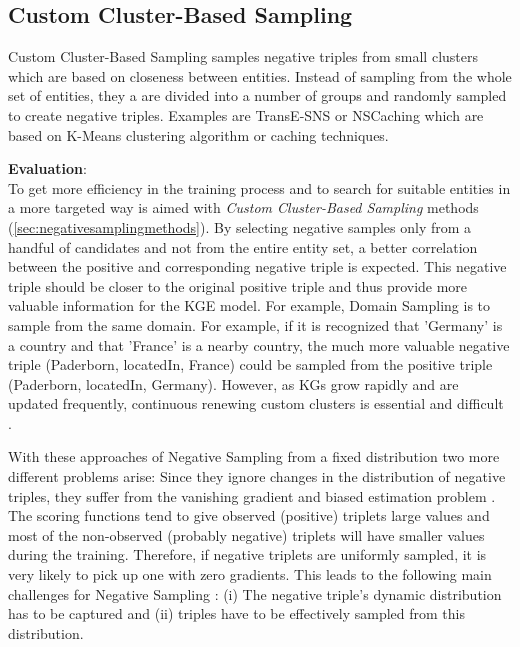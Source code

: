 \subsection{Custom Cluster-Based Sampling}
\label{subsec:custom_cluster_based_sampling}


Custom Cluster-Based Sampling samples negative triples from small clusters which are based on closeness between entities.
Instead of sampling from the whole set of entities, they a are divided into a number of groups and randomly sampled to create negative triples. Examples are TransE-\ac{SNS} \cite{TransE-SNS} or \ac{NSCaching} \cite{zhang2019nscaching} which are based on K-Means clustering algorithm or caching techniques. 


\textbf{Evaluation}:\\
To get more efficiency in the training process and to search for suitable entities in a more targeted way is aimed with  \textit{Custom Cluster-Based Sampling} methods (\autoref{sec:negativesamplingmethods}).
By selecting negative samples only from a handful of candidates and not from the entire entity set, a better correlation between the positive and corresponding negative triple is expected.
This negative triple should be closer to the original positive triple and thus provide more valuable information for the \ac{KGE} model.
For example, Domain Sampling \cite{domainSampling} is to sample from the same domain.
For example, if it is recognized that 'Germany' is a country and that 'France' is a nearby country, the much more valuable negative triple (Paderborn, locatedIn, France) could be sampled from the  positive triple (Paderborn, locatedIn, Germany).
However, as \acp{KG} grow rapidly and are updated frequently, continuous renewing custom clusters is essential and difficult \cite{qianunderstanding}.

With these approaches of Negative Sampling from a fixed distribution two more different problems arise:
Since they ignore changes in the distribution of negative triples, they suffer from the vanishing gradient and biased estimation problem \cite{zhang2021efficient}.
The scoring functions tend to give observed (positive) triplets large values and most of the non-observed (probably negative) triplets will have smaller values during the training.
Therefore, if negative triplets are uniformly sampled, it is very likely to pick up one with zero gradients.
This leads to the following main challenges for Negative Sampling \cite{zhang2021efficient}: 
(i) The negative triple's dynamic distribution has to be captured and 
(ii) triples have to be effectively sampled from this distribution.